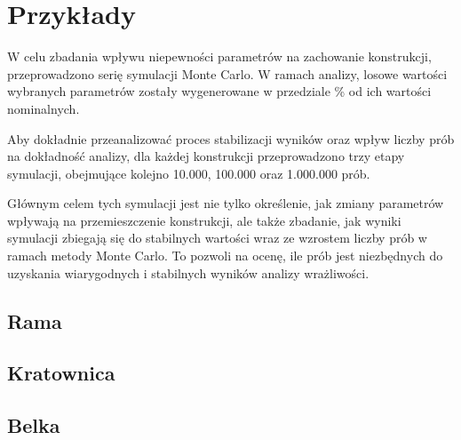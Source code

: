 \section{Przykłady}

W celu zbadania wpływu niepewności parametrów na zachowanie konstrukcji, przeprowadzono serię symulacji Monte Carlo.
W ramach analizy, losowe wartości wybranych parametrów zostały wygenerowane w przedziale \% od ich wartości nominalnych.

Aby dokładnie przeanalizować proces stabilizacji wyników oraz wpływ liczby prób na dokładność analizy,
dla każdej konstrukcji przeprowadzono trzy etapy symulacji, obejmujące kolejno 10.000, 100.000 oraz 1.000.000 prób.

Głównym celem tych symulacji jest nie tylko określenie, jak zmiany parametrów wpływają na przemieszczenie konstrukcji,
ale także zbadanie, jak wyniki symulacji zbiegają się do stabilnych wartości wraz ze wzrostem liczby prób w ramach metody Monte Carlo.
To pozwoli na ocenę, ile prób jest niezbędnych do uzyskania wiarygodnych i stabilnych wyników analizy wrażliwości.

\newpage
\subsection{Rama}


\newpage
\subsection{Kratownica}


\newpage
\subsection{Belka}

